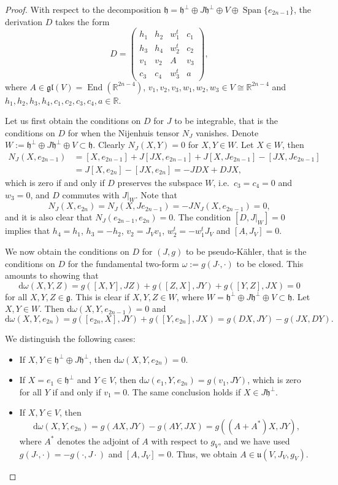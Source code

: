 \documentclass{article}
\theoremstyle{definition}
\DeclareMathOperator{\End}{End}
\newcommand{\R}{\mathbb{R}}
\newcommand{\frg}{\mathfrak{g}}
\newcommand{\frh}{\mathfrak{h}}
\renewcommand{\d}{\mathrm{d}}
\newcommand{\Span}[1]{\operatorname{Span}\{#1\}}
\begin{document}
\begin{proof}
    With respect to the decomposition $\frh=\frh^\perp\oplus J\frh^\perp\oplus V\oplus\Span{e_{2n-1}}$, the derivation $D$ takes the form $$D=\begin{pmatrix}
        h_1&h_2&w_1^t&c_1\\
        h_3&h_4&w_2^t&c_2\\
        v_1&v_2&A&v_3\\
        c_3&c_4&w_3^t&a
    \end{pmatrix},$$ where $A\in\mathfrak{gl}(V)=\End(\R^{2n-4})$, $v_1,v_2,v_3,w_1,w_2,w_3\in V\cong\R^{2n-4}$ and $h_1,h_2,h_3,h_4,c_1,c_2,c_3,c_4,a\in\R$.\medskip

    Let us first obtain the conditions on $D$ for $J$ to be integrable, that is the conditions on $D$ for when the Nijenhuis tensor $N_J$ vanishes. Denote $W:=\frh^\perp\oplus J\frh^\perp\oplus V\subset\frh$. Clearly $N_J(X,Y)=0$ for $X,Y\in W$. Let $X\in W$, then \begin{align*}
        N_J(X,e_{2n-1})&=[X,e_{2n-1}]+J[JX,e_{2n-1}]+J[X,Je_{2n-1}]-[JX,Je_{2n-1}]\\
        &=J[X,e_{2n}]-[JX,e_{2n}]=-JDX+DJX,
    \end{align*} which is zero if and only if $D$ preserves the subspace $W$, i.e.\ $c_3=c_4=0$ and $w_3=0$, and $D$ commutes with $J|_W$. Note that $$N_J(X,e_{2n})=N_J(X,Je_{2n-1})=-JN_J(X,e_{2n-1})=0,$$ and it is also clear that $N_J(e_{2n-1},e_{2n})=0$. The condition $[D,J|_W]=0$ implies that $h_4=h_1$, $h_3=-h_2$, $v_2=J_Vv_1$, $w_2^t=-w_1^tJ_V$ and $[A,J_V]=0$.\medskip
    
    We now obtain the conditions on $D$ for $(J,g)$ to be pseudo-Kähler, that is the conditions on $D$ for the fundamental two-form $\omega:=g(J\cdot,\cdot)$ to be closed. This amounts to showing that $$\d\omega(X,Y,Z)=g([X,Y],JZ)+g([Z,X],JY)+g([Y,Z],JX)=0$$ for all $X,Y,Z\in\frg$. This is clear if $X,Y,Z\in W$, where $W=\frh^\perp\oplus J\frh^\perp\oplus V\subset\frh$. Let $X,Y\in W$. Then $\d\omega(X,Y,e_{2n-1})=0$ and $$\d\omega(X,Y,e_{2n})=g([e_{2n},X],JY)+g([Y,e_{2n}],JX)=g(DX,JY)-g(JX,DY).$$

    We distinguish the following cases: \begin{itemize}
        \item If $X,Y\in\frh^\perp\oplus J\frh^\perp$, then $\d\omega(X,Y,e_{2n})=0$.
        \item If $X=e_1\in\frh^\perp$ and $Y\in V$, then $\d\omega(e_1,Y,e_{2n})=g(v_1,JY)$, which is zero for all $Y$ if and only if $v_1=0$. The same conclusion holds if $X\in J\frh^\perp$.
        \item If $X,Y\in V$, then $$\d\omega(X,Y,e_{2n})=g(AX,JY)-g(AY,JX)=g((A+A^*)X,JY),$$ where $A^*$ denotes the adjoint of $A$ with respect to $g_V$, and we have used $g(J\cdot,\cdot)=-g(\cdot,J\cdot)$ and $[A,J_V]=0$. Thus, we obtain $A\in\mathfrak{u}(V,J_V,g_V)$.
    \end{itemize}


\end{proof}
\end{document}
